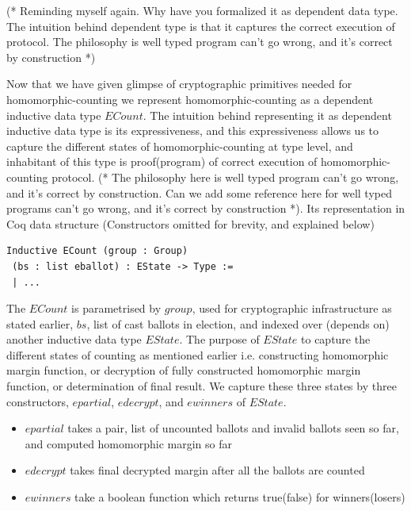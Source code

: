\documentclass{llncs}
\begin{document}
 
(* Reminding myself again. Why have you formalized it as dependent data type. 
   The intuition behind dependent type is that it captures the 
   correct execution of protocol. The philosophy is well typed 
   program can't go wrong, and it's correct by construction *)
   
Now that we have given glimpse of cryptographic primitives needed for 
homomorphic-counting we represent homomorphic-counting  as a 
dependent inductive data type $ECount$. 
The intuition behind representing it as 
dependent inductive data type is its expressiveness, and this expressiveness 
 allows us to capture the  different states of 
homomorphic-counting at type level, and inhabitant of this type 
is proof(program) of correct execution of  homomorphic-counting protocol.
(* The philosophy here is well typed program can't go wrong, and it's 
correct by construction.
  Can we add some reference here 
for well typed programs can't go wrong, and it's correct by construction
   *). Its 
representation in Coq data structure (Constructors omitted for brevity, 
and explained below)
\begin{verbatim}
Inductive ECount (group : Group) 
 (bs : list eballot) : EState -> Type :=
 | ... 
\end{verbatim}
The $ECount$ is parametrised by $group$, used for cryptographic 
infrastructure as stated earlier, 
$bs$, list of cast ballots in election, and indexed over (depends on)
 another inductive data type $EState$.  The purpose of $EState$ to capture 
the different states 
of counting as mentioned earlier i.e. constructing homomorphic margin 
function, or decryption of fully constructed homomorphic margin function, or 
determination of final result. We capture these three states by 
 three constructors, $epartial$, $edecrypt$, and $ewinners$ of 
 $EState$.

\begin{itemize}
 \item $epartial$ takes a pair, list of uncounted ballots and invalid ballots seen 
       so far, and computed homomorphic margin so far
 \item $edecrypt$ takes final decrypted margin after all the ballots are counted
 \item $ewinners$ take a boolean function which returns true(false) for winners(losers)
\end{itemize}

\end{document}
